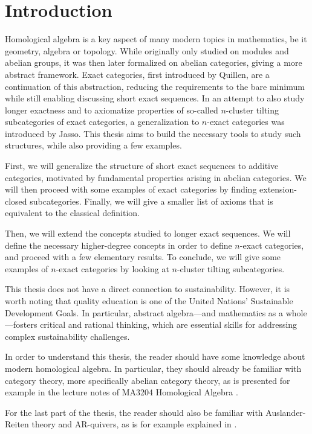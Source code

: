 \section*{Introduction}

Homological algebra is a key aspect of many modern topics in mathematics, be it geometry, algebra or topology. While originally only studied on modules and abelian groups, it was then later formalized on abelian categories, giving a more abstract framework. Exact categories, first introduced by Quillen, are a continuation of this abstraction, reducing the requirements to the bare minimum while still enabling discussing short exact sequences. In an attempt to also study longer exactness and to axiomatize properties of so-called $n$-cluster tilting subcategories of exact categories, a generalization to $n$-exact categories was introduced by Jasso. This thesis aims to build the necessary tools to study such structures, while also providing a few examples.

First, we will generalize the structure of short exact sequences to additive categories, motivated by fundamental properties arising in abelian categories. We will then proceed with some examples of exact categories by finding extension-closed subcategories. Finally, we will give a smaller list of axioms that is equivalent to the classical definition.

Then, we will extend the concepts studied to longer exact sequences. We will define the necessary higher-degree concepts in order to define $n$-exact categories, and proceed with a few elementary results. To conclude, we will give some examples of $n$-exact categories by looking at $n$-cluster tilting subcategories.

This thesis does not have a direct connection to sustainability. However, it is worth noting that quality education is one of the United Nations' Sustainable Development Goals. In particular, abstract algebra—and mathematics as a whole—fosters critical and rational thinking, which are essential skills for addressing complex sustainability challenges.

In order to understand this thesis, the reader should have some knowledge about modern homological algebra. In particular, they should already be familiar with category theory, more specifically abelian category theory, as is presented for example in the lecture notes of MA3204 Homological Algebra \cite{homalg}.

For the last part of the thesis, the reader should also be familiar with Auslander-Reiten theory and AR-quivers, as is for example explained in \cite{Assem}.



